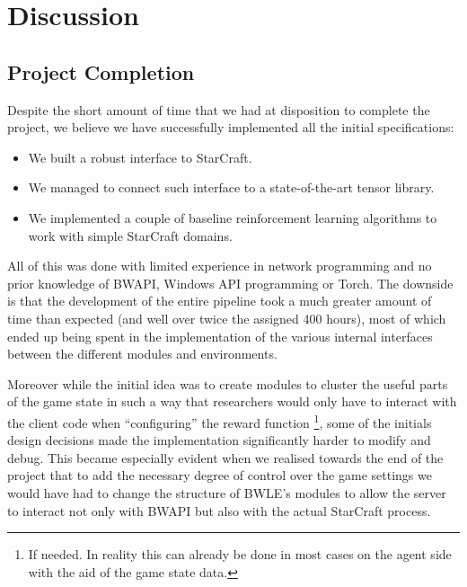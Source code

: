 
\chapter{Discussion}

\section{Project Completion}

Despite the short amount of time that we had at disposition to complete the
project, we believe we have successfully implemented all the initial specifications:

\begin{itemize}
\item We built a robust interface to StarCraft.
\item We managed to connect such interface to a state-of-the-art tensor library.
\item We implemented a couple of baseline reinforcement learning algorithms to
  work with simple StarCraft domains.
\end{itemize}

All of this was done with limited experience in network programming and no prior
knowledge of BWAPI, Windows API programming or Torch. The downside is that the
development of the entire pipeline took a much greater amount of time than
expected (and well over twice the assigned 400 hours), most of which ended up
being spent in the implementation of the various internal interfaces between the
different modules and environments.

Moreover while the initial idea was to create modules to cluster the useful
parts of the game state in such a way that researchers would only have to
interact with the client code when ``configuring'' the reward function
\footnote{If needed. In reality this can already be done in most cases on the
  agent side with the aid of the game state data.}, some of the initials design
decisions made the implementation significantly harder to modify and debug. This
became especially evident when we realised towards the end of the project that
to add the necessary degree of control over the game settings we would have had
to change the structure of BWLE's modules to allow the server to interact not
only with BWAPI but also with the actual StarCraft process.

